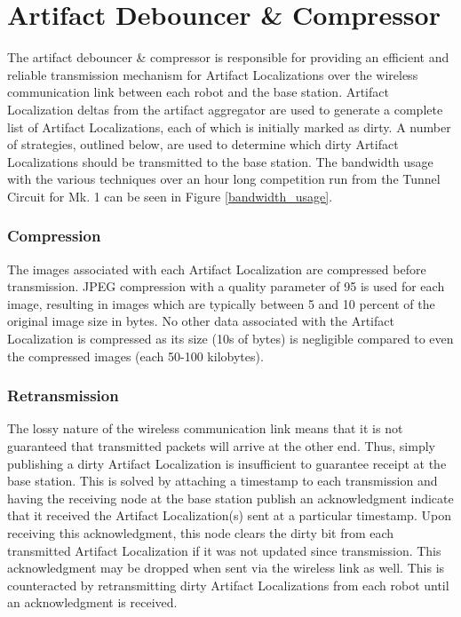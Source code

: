 \section{Artifact Debouncer \& Compressor}

The artifact debouncer \& compressor is responsible for providing an efficient and reliable transmission mechanism for Artifact Localizations over the wireless communication link between each robot and the base station. Artifact Localization deltas from the artifact aggregator are used to generate a complete list of Artifact Localizations, each of which is initially marked as dirty. A number of strategies, outlined below, are used to determine which dirty Artifact Localizations should be transmitted to the base station. The bandwidth usage with the various techniques over an hour long competition run from the Tunnel Circuit for Mk. 1 can be seen in Figure \ref{bandwidth_usage}.

\subsubsection{Compression}
The images associated with each Artifact Localization are compressed before transmission. JPEG compression with a quality parameter of 95 is used for each image, resulting in images which are typically between 5 and 10 percent of the original image size in bytes. No other data associated with the Artifact Localization is compressed as its size (10s of bytes) is negligible compared to even the compressed images (each 50-100 kilobytes).
	
\subsubsection{Retransmission} 
The lossy nature of the wireless communication link means that it is not guaranteed that transmitted packets will arrive at the other end. Thus, simply publishing a dirty Artifact Localization is insufficient to guarantee receipt at the base station. This is solved by attaching a timestamp to each transmission and having the receiving node at the base station publish an acknowledgment indicate that it received the Artifact Localization(s) sent at a particular timestamp. Upon receiving this acknowledgment, this node clears the dirty bit from each transmitted Artifact Localization if it was not updated since transmission. This acknowledgment may be dropped when sent via the wireless link as well. This is counteracted by retransmitting dirty Artifact Localizations from each robot until an acknowledgment is received.
	
